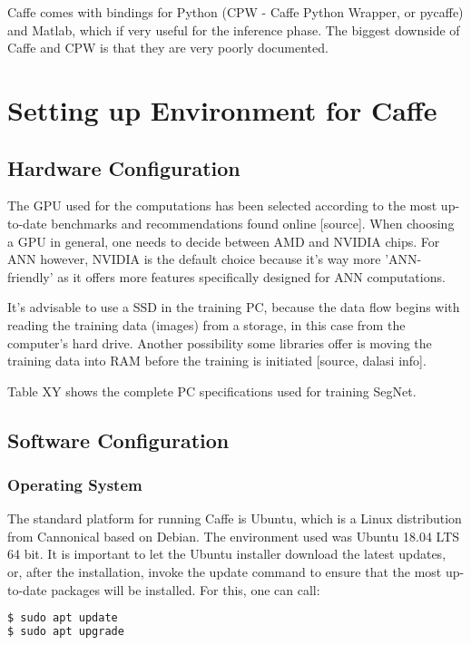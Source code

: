 Caffe comes with bindings for Python (CPW - Caffe Python Wrapper, or pycaffe) and Matlab, which if very useful for the inference phase. The biggest downside of Caffe and CPW is that they are very poorly documented.

\section{Setting up Environment for Caffe}

\subsection{Hardware Configuration}

The GPU used for the computations has been selected according to the most up-to-date benchmarks and recommendations found online [source]. When choosing a GPU in general, one needs to decide between AMD and NVIDIA chips. For ANN however, NVIDIA is the default choice because it's way more 'ANN-friendly' as it offers more features specifically designed for ANN computations. 

It's advisable to use a SSD in the training PC, because the data flow begins with reading the training data (images) from a storage, in this case from the computer's hard drive. Another possibility some libraries offer is moving the training data into RAM before the training is initiated [source, dalasi info]. 

Table XY shows the complete PC specifications used for training SegNet. 

\subsection{Software Configuration} 

\subsubsection{Operating System} 

The standard platform for running Caffe is Ubuntu, which is a Linux distribution from Cannonical based on Debian. The environment used was Ubuntu 18.04 LTS 64 bit. It is important to let the Ubuntu installer download the latest updates, or, after the installation, invoke the update command to ensure that the most up-to-date packages will be installed. For this, one can call:

\begin{lstlisting}[language=bash]
$ sudo apt update
$ sudo apt upgrade
\end{lstlisting}

